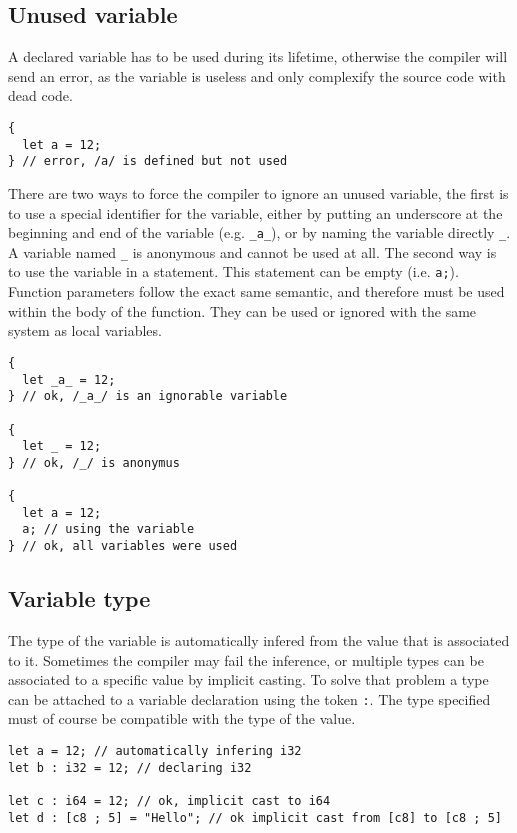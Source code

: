 \subsection{Unused variable}

A declared variable has to be used during its lifetime, otherwise the compiler
will send an error, as the variable is useless and only complexify the source
code with dead code.

\begin{lstlisting}[style=coloredverbatim]
{
  let a = 12;
} // error, /a/ is defined but not used
\end{lstlisting}

There are two ways to force the compiler to ignore an unused variable, the first
is to use a special identifier for the variable, either by putting an underscore
at the beginning and end of the variable (e.g. \texttt{\_a\_}), or by naming the
variable directly \texttt{\_}. A variable named \texttt{\_} is anonymous and
cannot be used at all. The second way is to use the variable in a statement.
This statement can be empty (i.e. \texttt{a;}). Function parameters follow the
exact same semantic, and therefore must be used within the body of the function.
They can be used or ignored with the same system as local variables.

\begin{lstlisting}[style=coloredverbatim]
{
  let _a_ = 12;
} // ok, /_a_/ is an ignorable variable

{
  let _ = 12;
} // ok, /_/ is anonymus

{
  let a = 12;
  a; // using the variable
} // ok, all variables were used
\end{lstlisting}

\subsection{Variable type}

The type of the variable is automatically infered from the value that is
associated to it. Sometimes the compiler may fail the inference, or multiple
types can be associated to a specific value by implicit casting. To solve that
problem a type can be attached to a variable declaration using the token
\texttt{:}. The type specified must of course be compatible with the type of the
value.

\begin{lstlisting}[style=coloredverbatim]
let a = 12; // automatically infering i32
let b : i32 = 12; // declaring i32

let c : i64 = 12; // ok, implicit cast to i64
let d : [c8 ; 5] = "Hello"; // ok implicit cast from [c8] to [c8 ; 5]
\end{lstlisting}

